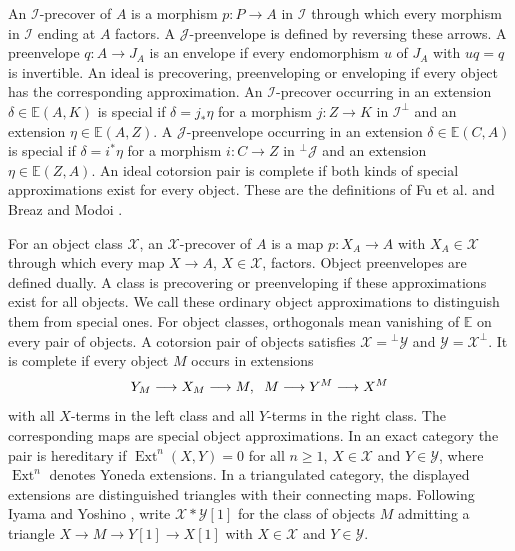 \documentclass[11pt,a4paper,reqno]{amsart}
\newcommand{\Ical}{\mathcal I}
\newcommand{\Xcal}{\mathcal X}
\theoremstyle{plain}
\theoremstyle{definition}
\theoremstyle{remark}
\newcommand{\Jcal}{\mathcal J}
\newcommand{\Ycal}{\mathcal Y}
\newcommand{\Ext}{\operatorname{Ext}}
\begin{document}
An $\Ical$-precover of $A$ is a morphism $p:P\to A$ in $\Ical$ through which every morphism in $\Ical$ ending at $A$ factors. A $\Jcal$-preenvelope is defined by reversing these arrows. A preenvelope $q:A\to J_A$ is an envelope if every endomorphism $u$ of $J_A$ with $uq=q$ is invertible. An ideal is precovering, preenveloping or enveloping if every object has the corresponding approximation. An $\Ical$-precover occurring in an extension $\delta\in\mathbb E(A,K)$ is special if $\delta=j_*\eta$ for a morphism $j:Z\to K$ in $\Ical^\perp$ and an extension $\eta\in\mathbb E(A,Z)$. A $\Jcal$-preenvelope occurring in an extension $\delta\in\mathbb E(C,A)$ is special if $\delta=i^*\eta$ for a morphism $i:C\to Z$ in ${}^\perp\Jcal$ and an extension $\eta\in\mathbb E(Z,A)$. An ideal cotorsion pair is complete if both kinds of special approximations exist for every object. These are the definitions of Fu et al. \cite{FGHT13} and Breaz and Modoi \cite[Sections~3.2--3.4]{BM21}.

For an object class $\Xcal$, an $\Xcal$-precover of $A$ is a map $p:X_A\to A$ with $X_A\in\Xcal$ through which every map $X\to A$, $X\in\Xcal$, factors. Object preenvelopes are defined dually. A class is precovering or preenveloping if these approximations exist for all objects. We call these ordinary object approximations to distinguish them from special ones. For object classes, orthogonals mean vanishing of $\mathbb E$ on every pair of objects. A cotorsion pair of objects satisfies $\Xcal={}^\perp\Ycal$ and $\Ycal=\Xcal^\perp$. It is complete if every object $M$ occurs in extensions
$$
Y_M\longrightarrow X_M\longrightarrow M,
\hspace{2mm}
M\longrightarrow Y^M\longrightarrow X^M
$$
with all $X$-terms in the left class and all $Y$-terms in the right class. The corresponding maps are special object approximations. In an exact category the pair is hereditary if $\Ext^n(X,Y)=0$ for all $n\geq1$, $X\in\Xcal$ and $Y\in\Ycal$, where $\Ext^n$ denotes Yoneda extensions. In a triangulated category, the displayed extensions are distinguished triangles with their connecting maps. Following Iyama and Yoshino \cite[Definition~2.2]{IY08}, write $\Xcal*\Ycal[1]$ for the class of objects $M$ admitting a triangle $X\to M\to Y[1]\to X[1]$ with $X\in\Xcal$ and $Y\in\Ycal$.
\end{document}
